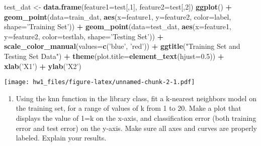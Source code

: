 \documentclass[]{article}
\newenvironment{Shaded}{\begin{snugshade}}{\end{snugshade}}
\newcommand{\DataTypeTok}[1]{\textcolor[rgb]{0.13,0.29,0.53}{#1}}
\newcommand{\DecValTok}[1]{\textcolor[rgb]{0.00,0.00,0.81}{#1}}
\newcommand{\FloatTok}[1]{\textcolor[rgb]{0.00,0.00,0.81}{#1}}
\newcommand{\KeywordTok}[1]{\textcolor[rgb]{0.13,0.29,0.53}{\textbf{#1}}}
\newcommand{\NormalTok}[1]{#1}
\newcommand{\OperatorTok}[1]{\textcolor[rgb]{0.81,0.36,0.00}{\textbf{#1}}}
\newcommand{\StringTok}[1]{\textcolor[rgb]{0.31,0.60,0.02}{#1}}
\providecommand{\tightlist}{%
  \setlength{\itemsep}{0pt}\setlength{\parskip}{0pt}}
\begin{document}
\begin{Shaded}
\begin{Highlighting}[]
\NormalTok{test_dat <-}\StringTok{ }\KeywordTok{data.frame}\NormalTok{(}\DataTypeTok{feature1=}\NormalTok{test[,}\DecValTok{1}\NormalTok{], }\DataTypeTok{feature2=}\NormalTok{test[,}\DecValTok{2}\NormalTok{])}
\KeywordTok{ggplot}\NormalTok{() }\OperatorTok{+}\StringTok{ }\KeywordTok{geom_point}\NormalTok{(}\DataTypeTok{data=}\NormalTok{train_dat, }\KeywordTok{aes}\NormalTok{(}\DataTypeTok{x=}\NormalTok{feature1, }\DataTypeTok{y=}\NormalTok{feature2, }\DataTypeTok{color=}\NormalTok{label, }\DataTypeTok{shape=}\StringTok{'Training Set'}\NormalTok{)) }\OperatorTok{+}\StringTok{ }\KeywordTok{geom_point}\NormalTok{(}\DataTypeTok{data=}\NormalTok{test_dat, }\KeywordTok{aes}\NormalTok{(}\DataTypeTok{x=}\NormalTok{feature1, }\DataTypeTok{y=}\NormalTok{feature2, }\DataTypeTok{color=}\NormalTok{testlab, }\DataTypeTok{shape=}\StringTok{'Testing Set'}\NormalTok{)) }\OperatorTok{+}\StringTok{ }\KeywordTok{scale_color_manual}\NormalTok{(}\DataTypeTok{values=}\KeywordTok{c}\NormalTok{(}\StringTok{'blue'}\NormalTok{, }\StringTok{'red'}\NormalTok{)) }\OperatorTok{+}\StringTok{ }\KeywordTok{ggtitle}\NormalTok{(}\StringTok{"Training Set and Testing Set Data"}\NormalTok{) }\OperatorTok{+}\StringTok{ }\KeywordTok{theme}\NormalTok{(}\DataTypeTok{plot.title=}\KeywordTok{element_text}\NormalTok{(}\DataTypeTok{hjust=}\FloatTok{0.5}\NormalTok{)) }\OperatorTok{+}\StringTok{ }\KeywordTok{xlab}\NormalTok{(}\StringTok{'X1'}\NormalTok{) }\OperatorTok{+}\StringTok{ }\KeywordTok{ylab}\NormalTok{(}\StringTok{'X2'}\NormalTok{)}
\end{Highlighting}
\end{Shaded}

\texttt{[image: hw1\_files/figure-latex/unnamed-chunk-2-1.pdf]}

\begin{enumerate}
\def\labelenumi{(\alph{enumi})}
\setcounter{enumi}{2}
\tightlist
\item
  Using the knn function in the library class, fit a k-nearest neighbors
  model on the training set, for a range of values of k from 1 to 20.
  Make a plot that displays the value of 1=k on the x-axis, and
  classification error (both training error and test error) on the
  y-axis. Make sure all axes and curves are properly labeled. Explain
  your results.
\end{enumerate}
\end{document}

